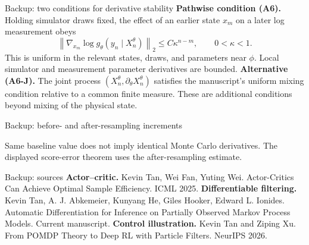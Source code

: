 \begin{frame}{Backup: two conditions for derivative stability}
\textbf{Pathwise condition (A6).} Holding simulator draws fixed, the effect of an earlier state $x_m$ on a later log measurement obeys
\[
\left\|\nabla_{x_m}\log g_\theta(y_n\mid X_n^\theta)\right\|_2
\leq C\kappa^{n-m},\qquad 0<\kappa<1.
\]
This is uniform in the relevant states, draws, and parameters near $\phi$. Local simulator and measurement parameter derivatives are bounded.\gap
\textbf{Alternative (A6-J).} The joint process
$(X_n^\theta,\partial_\theta X_n^\theta)$ satisfies the manuscript's uniform mixing condition relative to a common finite measure.\gap
These are additional conditions beyond mixing of the physical state.
\end{frame}

\begin{frame}{Backup: before- and after-resampling increments}
\begin{center}\end{center}
\pause Same baseline value does not imply identical Monte Carlo derivatives.
\gap The displayed score-error theorem uses the after-resampling estimate.
\end{frame}

\begin{frame}{Backup: sources}
\small
\textbf{Actor--critic.} Kevin Tan, Wei Fan, Yuting Wei. Actor-Critics Can Achieve Optimal Sample Efficiency. ICML 2025.\gap
\textbf{Differentiable filtering.} Kevin Tan, A. J. Abkemeier, Kunyang He, Giles Hooker, Edward L. Ionides. Automatic Differentiation for Inference on Partially Observed Markov Process Models. Current manuscript.\gap
\textbf{Control illustration.} Kevin Tan and Ziping Xu. From POMDP Theory to Deep RL with Particle Filters. NeurIPS 2026.\gap

\end{frame}
